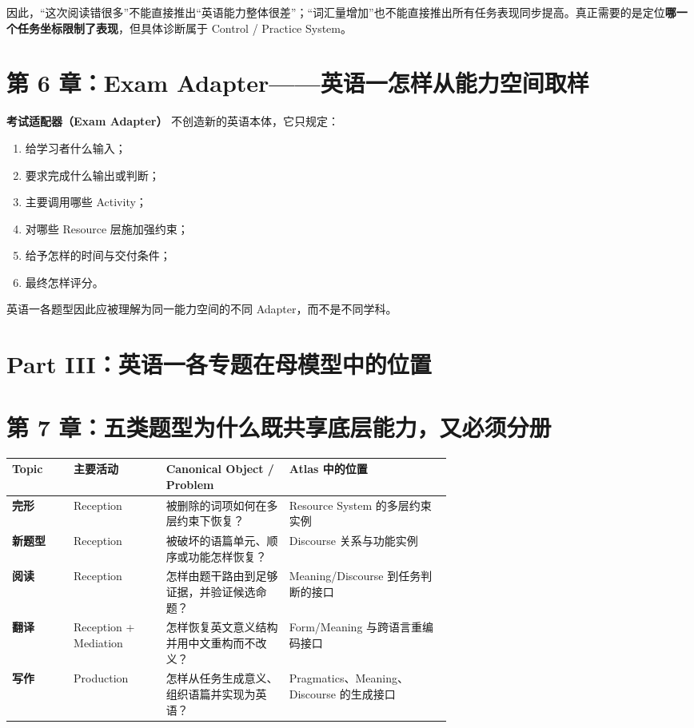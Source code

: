 \documentclass[11pt,a4paper]{ctexart}
\newcommand{\kw}[1]{\textbf{#1}}
\newcommand{\term}[2]{\textbf{#1（#2）}}
\begin{document}
因此，“这次阅读错很多”不能直接推出“英语能力整体很差”；“词汇量增加”也不能直接推出所有任务表现同步提高。真正需要的是定位\kw{哪一个任务坐标限制了表现}，但具体诊断属于 Control / Practice System。

\section{第 6 章：Exam Adapter——英语一怎样从能力空间取样}

\term{考试适配器}{Exam Adapter} 不创造新的英语本体，它只规定：
\begin{enumerate}
  \item 给学习者什么输入；
  \item 要求完成什么输出或判断；
  \item 主要调用哪些 Activity；
  \item 对哪些 Resource 层施加强约束；
  \item 给予怎样的时间与交付条件；
  \item 最终怎样评分。
\end{enumerate}

英语一各题型因此应被理解为同一能力空间的不同 Adapter，而不是不同学科。

\newpage
\section{Part III：英语一各专题在母模型中的位置}

\section{第 7 章：五类题型为什么既共享底层能力，又必须分册}

\begin{center}
\small
\begin{tabularx}{\linewidth}{>{\bfseries}p{0.14\linewidth} p{0.21\linewidth} p{0.29\linewidth} Y}
\toprule
Topic & 主要活动 & Canonical Object / Problem & Atlas 中的位置 \\
\midrule
完形 & Reception & 被删除的词项如何在多层约束下恢复？ & Resource System 的多层约束实例 \\
新题型 & Reception & 被破坏的语篇单元、顺序或功能怎样恢复？ & Discourse 关系与功能实例 \\
阅读 & Reception & 怎样由题干路由到足够证据，并验证候选命题？ & Meaning/Discourse 到任务判断的接口 \\
翻译 & Reception + Mediation & 怎样恢复英文意义结构并用中文重构而不改义？ & Form/Meaning 与跨语言重编码接口 \\
写作 & Production & 怎样从任务生成意义、组织语篇并实现为英语？ & Pragmatics、Meaning、Discourse 的生成接口 \\
\bottomrule
\end{tabularx}
\end{center}
\end{document}
